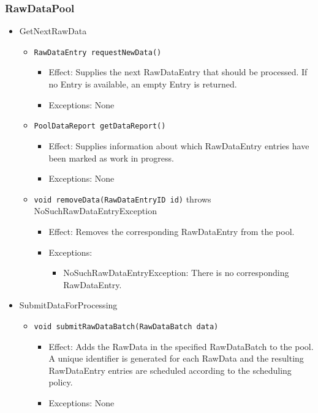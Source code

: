 \documentclass[a4paper,10pt]{article}
\begin{document}
\subsubsection*{RawDataPool}
\begin{itemize}
	\item GetNextRawData
	\begin{itemize}
		\item \texttt{RawDataEntry requestNewData()}
		\begin{itemize}
			\item Effect: Supplies the next RawDataEntry that should be processed. If no Entry is available, an empty Entry is returned.
			\item Exceptions: None
		\end{itemize}
		
		\item \texttt{PoolDataReport getDataReport()}
		\begin{itemize}
			\item Effect: Supplies information about which RawDataEntry entries have been marked as work in progress.
			\item Exceptions: None
		\end{itemize}
		
		\item \texttt{void removeData(RawDataEntryID id)} throws NoSuchRawDataEntryException
		\begin{itemize}
			\item Effect: Removes the corresponding RawDataEntry from the pool.
			\item Exceptions: 
			\begin{itemize}
				\item NoSuchRawDataEntryException: There is no corresponding RawDataEntry.
			\end{itemize}
		\end{itemize}
	\end{itemize}
\end{itemize}

\begin{itemize}
	\item SubmitDataForProcessing
	\begin{itemize}
		\item \texttt{void submitRawDataBatch(RawDataBatch data)}
		\begin{itemize}
			\item Effect: Adds the RawData in the specified RawDataBatch to the pool. A unique identifier is generated for each RawData and the resulting RawDataEntry entries are scheduled according to the scheduling policy.
			\item Exceptions: None
		\end{itemize}
	\end{itemize}
\end{itemize}
\end{document}
